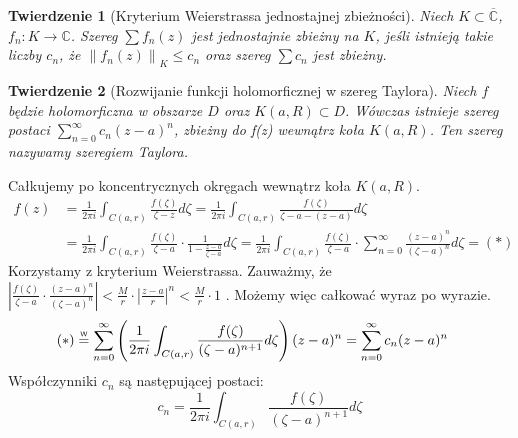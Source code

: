 \documentclass[11pt]{article}
\newcommand{\abs}[1]{\left|#1\right|} %
\newcommand{\norm}[1]{\left\lVert#1\right\rVert} %
\newcommand{\extcomplex}{\overline{\mathbb{C}}} %
\newcommand{\eqtext}[1]{\overset{\text{\tiny\sffamily #1}}{=}} %
\theoremstyle{plain}
\newtheorem*{theorem}{Twierdzenie}
\theoremstyle{definition}
\theoremstyle{remark}
\let\oldendproof\endproof
\renewenvironment{proof}[1][\proofname]{
  \oldproof[\textsc{\small #1}]
}{\oldendproof}
\begin{document}
\begin{theorem}[Kryterium Weierstrassa jednostajnej zbieżności]
  Niech $ K \subset \extcomplex $, $ f_{n} \colon K \to \mathbb{C} $. Szereg $ \sum f_{n}(z) $ jest jednostajnie zbieżny na $ K $, jeśli istnieją takie liczby $ c_{n} $, że $ \norm{f_n(z)}_K \leq c_{n} $ oraz szereg $ \sum c_{n} $ jest zbieżny.
\end{theorem}

\begin{adjustbox}{valign=C,raise=0em,minipage={1.0\linewidth}}
\setlength{\columnsep}{0.5cm}
\begin{wrapfigure}{r}{3cm}
    \vspace*{-1.5em}
    \resizebox{\linewidth}{!}{}
\end{wrapfigure}
\strut{}
\vspace*{-1.9em}

\begin{theorem}[Rozwijanie funkcji holomorficznej w szereg Taylora]
  Niech $ f $ będzie holomorficzna w obszarze $ D $ oraz $ K(a, R) \subset D $. Wówczas istnieje szereg postaci $ \sum_{n = 0}^{\infty} c_{n}(z-a)^{n} $, zbieżny do f(z) wewnątrz koła $ K(a, R) $. Ten szereg nazywamy szeregiem Taylora.
\end{theorem}

\end{adjustbox}

\begin{proof}
  Całkujemy po koncentrycznych okręgach wewnątrz koła $ K(a, R) $.
  \begin{align*}
    f(z) &
    = \frac{1}{2 \pi i} \int_{C(a, r)} \frac{f(\zeta)}{\zeta-z} d\zeta
    = \frac{1}{2 \pi i} \int_{C(a, r)} \frac{f(\zeta)}{\zeta-a-(z-a)} d\zeta \\ &
    = \frac{1}{2 \pi i} \int_{C(a, r)} \frac{f(\zeta)}{\zeta-a} \cdot \frac{1}{1 - \frac{z-a}{\zeta-a}} d\zeta
    = \frac{1}{2 \pi i} \int_{C(a, r)} \frac{f(\zeta)}{\zeta-a} \cdot \sum_{n=0}^{\infty} \frac{(z-a)^{n}}{(\zeta-a)^{n}} d\zeta = (*)
  \end{align*}
  Korzystamy z kryterium Weierstrassa. Zauważmy, że
  $
    \abs{\frac{f(\zeta)}{\zeta-a} \cdot \frac{(z-a)^{n}}{(\zeta-a)^{n}}}
    < \frac{M}{r} \cdot \abs{\frac{z-a}{r}}^n
    < \frac{M}{r} \cdot 1
  $
  . Możemy więc całkować wyraz po wyrazie.
  \begin{align*}
    (*) &
    \eqtext{W} \sum_{n=0}^{\infty} \left( \frac{1}{2 \pi i} \int_{C(a, r)} \frac{f(\zeta)}{(\zeta-a)^{n+1}} d\zeta \right)(z-a)^{n}
    = \sum_{n = 0}^{\infty} c_{n}(z-a)^{n}
  \end{align*}
  Współczynniki $ c_{n} $ są następującej postaci:
  $$
    c_{n} = \frac{1}{2 \pi i} \int_{C(a, r)} \frac{f(\zeta)}{(\zeta-a)^{n+1}} d\zeta
  $$
\end{proof}
\end{document}
